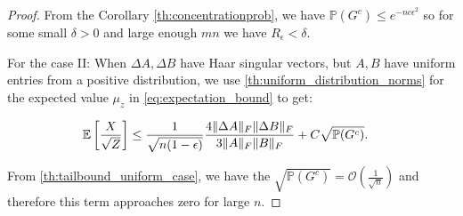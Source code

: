\documentclass[onefignum,onetabnum]{siamart171218}
\DeclarePairedDelimiter\norm{\lVert}{\rVert}
\begin{document}
\begin{proof}
From the Corollary \ref{th:concentrationprob}, we have $\mathbb{P}(G^c) \leq e^{-nc\epsilon^2}$ so for some small $\delta >0$ and large enough $mn$ we have $R_\epsilon < \delta$. 

For the case II: When $\Delta A, \Delta B$ have Haar singular vectors, but $A,B$ have uniform entries from a positive distribution, we use \cref{th:uniform_distribution_norms} for the expected value $\mu_z$ in \eqref{eq:expectation_bound} to get:

\begin{align*}
    \mathbb{E}\left[ \frac{X}{\sqrt{Z}}\right]  &\leq \frac{1}{\sqrt{n(1-\epsilon)}} \frac{4\norm{\Delta A}_F \norm{\Delta B}_F}{3 \norm{A}_F \norm{B}_F } + C \sqrt{\mathbb{P}(G^c)}.
\end{align*}

From \cref{th:tailbound_uniform_case}, we have the $\sqrt{\mathbb{P}(G^c)} = \mathcal{O}(\frac{1}{\sqrt{n}})$ and therefore this term approaches zero for large $n$. 
\end{proof}
\end{document}

